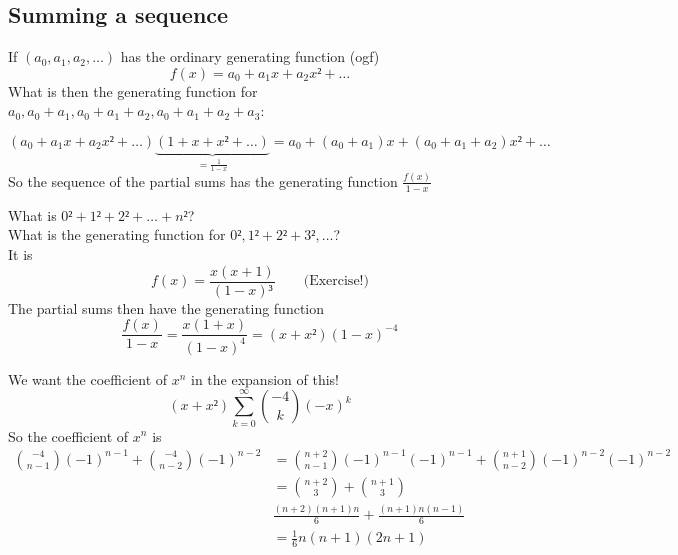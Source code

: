 \documentclass[english]{lbscript}
\begin{document}
\subsection{Summing a sequence}
\label{sec:summing-sequence}

If \((a_0, a_1, a_2, \dots)\) has the ordinary generating function (ogf)
\begin{equation}
  \label{eq:52}
  f(x) = a_0 + a_1x + a_2x²+\dots
\end{equation}
What is then the generating function for \(a_0, a_0+a_1, a_0+a_1+a_2, a_0+a_1+a_2+a_3\):

\begin{equation}
  \label{eq:53}
  \left(a_0+a_1x+a_2x²+\dots\right) \underbrace{\left(1+x+x²+\dots \right) }_{= \frac{1}{1-x}} = a_0 + (a_0+a_1)x+ (a_0+a_1+a_2)x²+\dots
\end{equation}
So the sequence of the partial sums has the generating function \(\frac{f(x)}{1-x}\)

\begin{example}{}{}
  What is \(0²+1²+2²+\dots+n²\)?\\
  What is the generating function for \(0²,1²+2²+3²,\dots\)?\\
  It is
  \begin{equation}
    \label{eq:55}
    f(x)= \frac{x(x+1)}{(1-x)³}\quad \quad \text{(Exercise!)}
  \end{equation}
  The partial sums then have the generating function
  \begin{equation}
    \label{eq:56}
    \frac{f(x)}{1-x} = \frac{x(1+x)}{(1-x)^{4}} = (x+x²)(1-x)^{-4}
  \end{equation}

  We want the coefficient of \(x^{n}\) in the expansion of this!\\
  \begin{equation}
    \label{eq:57}
    (x+x²) ∑_{k=0}^{∞} \binom{-4}{k} (-x)^{k}
  \end{equation}
  So the coefficient of \(x^{n}\) is
  \begin{align}
    \label{eq:58}
    \binom{-4}{n-1} (-1)^{n-1} + \binom{-4}{n-2} (-1)^{n-2}
     & = \binom{n+2}{n-1} (-1)^{n-1}(-1)^{n-1} + \binom{n+1}{n-2} (-1)^{n-2} (-1)^{n-2} \\
     & = \binom{n+2}{3} + \binom{n+1}{3}                                                \\
     & \frac{(n+2)(n+1)n}{6} + \frac{(n+1)n(n-1)}{6}                                    \\
     & = \frac{1}{6} n(n+1)(2n+1)
  \end{align}
\end{example}
\end{document}
